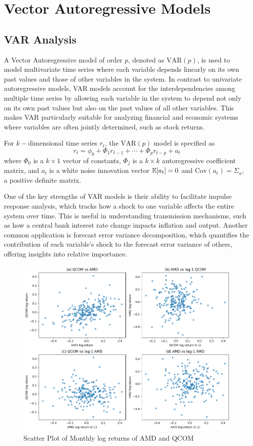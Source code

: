 \chapter{Vector Autoregressive Models}

\section{VAR Analysis}

A Vector Autoregressive model of order $p$, denoted as $\text{VAR}(p)$, is used to model multivariate time series where each variable depends linearly on its own past values and those of other variables in the system. In contrast to univariate autoregressive models, VAR models account for the interdependencies among multiple time series by allowing each variable in the system to depend not only on its own past values but also on the past values of all other variables. This makes VAR particularly suitable for analyzing financial and economic systems where variables are often jointly determined, such as stock returns.

For $k-$dimensional time series $r_t$, the $\text{VAR}(p)$ model is specified as 
\begin{equation}
	r_t=\phi_0+\Phi_1 r_{t-1}+\cdots+\Phi_pr_{t-p}+a_t
\end{equation}
where $\Phi_0$ is a $k\times 1$ vector of constants, $\Phi_j$ is a $k\times k$ autoregressive coefficient matrix, and $a_t$ is a white noise innovation vector $\amsbb{E}[a_t]=0$ and $\text{Cov}(a_t)=\Sigma_a,$ a positive definite matrix.

One of the key strengths of VAR models is their ability to facilitate impulse response analysis, which tracks how a shock to one variable affects the entire system over time. This is useful in understanding transmission mechanisms, such as how a central bank interest rate change impacts inflation and output. Another common application is forecast error variance decomposition, which quantifies the contribution of each variable’s shock to the forecast error variance of others, offering insights into relative importance.

\begin{figure}[!h]
	\centering
	\includegraphics[width=0.8\linewidth]{content/plots/amd_qcom_scatter.png}
	\caption{Scatter Plot of Monthly log returns of AMD and QCOM}
	\label{fig:amd_qcom_scatter}
\end{figure}

